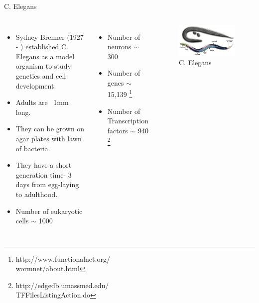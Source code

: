 \documentclass[serif,mathserif,final]{beamer}
\begin{document}
\begin{frame}{}
\begin{columns}[t]
\begin{column}{0.24\linewidth}
\begin{block}{C. Elegans}
\begin{columns}[c]
	\begin{itemize}
	\item Sydney Brenner (1927 - ) established C. Elegans as a model organism to study genetics and cell development.
	\item Adults are ~1mm long.
	\item They can be grown on agar plates with lawn of bacteria.
	\item They have a short generation time- 3 days from egg-laying to adulthood. 
	\item {Number of eukaryotic cells \color{green}$ \sim $ 1000} 
	
	\end{itemize}

	\begin{itemize}
	\item {Number of neurons \color{green} $ \sim $ 300} 
	\item {Number of genes \color{red} $ \sim $ 15,139} \footnote{http://www.functionalnet.org/\\wormnet/about.html}
	\item {Number of Transcription factors \color{red} $ \sim $ 940} \footnote{ http://edgedb.umassmed.edu/\\TFFilesListingAction.do}
	\end{itemize}

	\begin{figure}[!htb]
	\centering
	\includegraphics[scale=.4]{picture/celegans_image2.jpg}
	\caption{C. Elegans}
	\label{fig:cElegans}
	\end{figure}


\end{columns}
\end{block}
\end{column}
\end{columns}
\end{frame}
\end{document}
